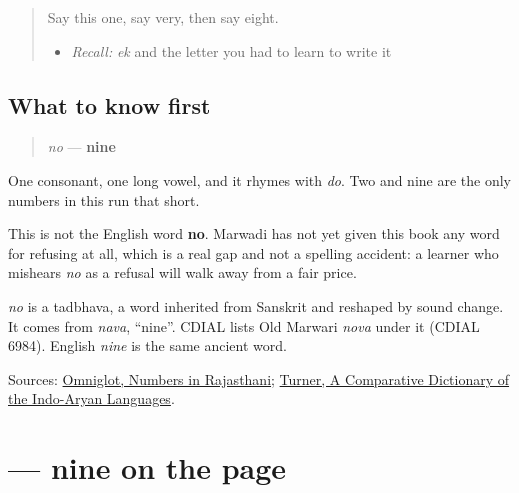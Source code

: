 \label{lesson:MW-C33-hear-no-nine}



\begin{quote}
Say this one, say very, then say eight.

\begin{itemize}
\raggedright
  \item \emph{Recall:} \emph{ek} and the letter \textbf{} you had to learn to write it
\end{itemize}
\end{quote}

\subsection*{What to know first}
\begin{quote}
\emph{no} — \textbf{nine}
\end{quote}

One consonant, one long vowel, and it rhymes with \emph{do}. Two and nine are the only numbers in this run that short.

This is not the English word \textbf{no}. Marwadi has not yet given this book any word for refusing at all, which is a real gap and not a spelling accident: a learner who mishears \emph{no} as a refusal will walk away from a fair price.

\begin{cousinweb}
\emph{no} is a tadbhava, a word inherited from Sanskrit and reshaped by sound change. It comes from \emph{nava}, \textquotedblleft{}nine\textquotedblright{}. CDIAL lists Old Marwari \emph{nova} under it (CDIAL 6984). English \emph{nine} is the same ancient word.
\end{cousinweb}

\begin{tcolorbox}[breakable,colback=teal!4,colframe=teal!35!black,title={Before you move on}]
Sources: \href{https://www.omniglot.com/language/numbers/rajasthani.htm}{Omniglot, Numbers in Rajasthani}; \href{https://dsal.uchicago.edu/dictionaries/soas/}{Turner, A Comparative Dictionary of the Indo-Aryan Languages}.
\end{tcolorbox}
\section[\texorpdfstring{\mw{नो} (no)}{नो (no)}]{ — nine on the page}

\label{lesson:MW-C33-no-nine}



